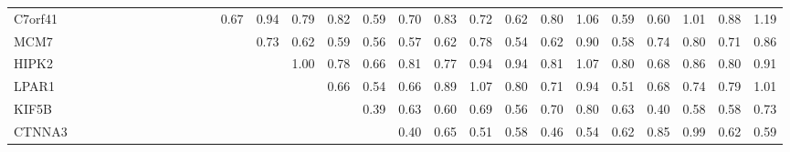 \begin{longtable}{lrrrrrrrrrrrrrrrrrrrrrrrrrrr}
C7orf41  &              &              &            &            &            &            &               &            &              &             &               &       0.67 &        0.94 &        0.79 &        0.82 &         0.59 &        0.70 &           0.83 &       0.72 &       0.62 &           0.80 &        1.06 &          0.59 &        0.60 &      1.01 &           0.88 &        1.19 \\
MCM7     &              &              &            &            &            &            &               &            &              &             &               &            &        0.73 &        0.62 &        0.59 &         0.56 &        0.57 &           0.62 &       0.78 &       0.54 &           0.62 &        0.90 &          0.58 &        0.74 &      0.80 &           0.71 &        0.86 \\
HIPK2    &              &              &            &            &            &            &               &            &              &             &               &            &             &        1.00 &        0.78 &         0.66 &        0.81 &           0.77 &       0.94 &       0.94 &           0.81 &        1.07 &          0.80 &        0.68 &      0.86 &           0.80 &        0.91 \\
LPAR1    &              &              &            &            &            &            &               &            &              &             &               &            &             &             &        0.66 &         0.54 &        0.66 &           0.89 &       1.07 &       0.80 &           0.71 &        0.94 &          0.51 &        0.68 &      0.74 &           0.79 &        1.01 \\
KIF5B    &              &              &            &            &            &            &               &            &              &             &               &            &             &             &             &         0.39 &        0.63 &           0.60 &       0.69 &       0.56 &           0.70 &        0.80 &          0.63 &        0.40 &      0.58 &           0.58 &        0.73 \\
CTNNA3   &              &              &            &            &            &            &               &            &              &             &               &            &             &             &             &              &        0.40 &           0.65 &       0.51 &       0.58 &           0.46 &        0.54 &          0.62 &        0.85 &      0.99 &           0.62 &        0.59 \\

\end{longtable}
